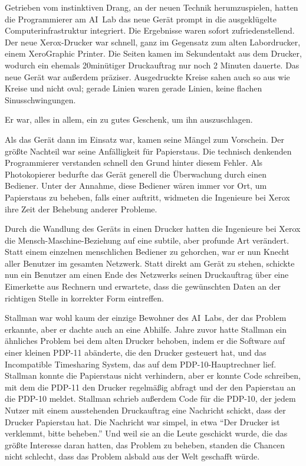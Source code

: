 Getrieben vom instinktiven Drang, an der neuen Technik herumzuspielen, hatten die Programmierer am AI~Lab das neue Gerät prompt in die ausgeklügelte Computerinfrastruktur integriert. Die Ergebnisse waren sofort zufriedenstellend. Der neue Xerox-Drucker war schnell, ganz im Gegensatz zum alten Labordrucker, einem XeroGraphic Printer. Die Seiten kamen im Sekundentakt aus dem Drucker, wodurch ein ehemals 20minütiger Druckauftrag nur noch 2 Minuten dauerte. Das neue Gerät war außerdem präziser. Ausgedruckte Kreise sahen auch so aus wie Kreise und nicht oval; gerade Linien waren gerade Linien, keine flachen Sinusschwingungen.

Er war, alles in allem, ein zu gutes Geschenk, um ihn auszuschlagen.

Als das Gerät dann im Einsatz war, kamen seine Mängel zum Vorschein. Der größte Nachteil war seine Anfälligkeit für Papierstaus. Die technisch denkenden Programmierer verstanden schnell den Grund hinter diesem Fehler. Als Photokopierer bedurfte das Gerät generell die Überwachung durch einen Bediener. Unter der Annahme, diese Bediener wären immer vor Ort, um Papierstaus zu beheben, falls einer auftritt, widmeten die Ingenieure bei Xerox ihre Zeit der Behebung anderer Probleme.

Durch die Wandlung des Geräts in einen  Drucker hatten die Ingenieure bei Xerox die Mensch-Maschine-Beziehung auf eine subtile, aber profunde Art verändert. Statt einem einzelnen menschlichen Bediener zu gehorchen, war er nun Knecht aller Benutzer im gesamten Netzwerk. Statt direkt am Gerät zu stehen, schickte nun ein Benutzer am einen Ende des Netzwerks seinen Druckauftrag über eine Eimerkette aus Rechnern und erwartete, dass die gewünschten Daten an der richtigen Stelle in korrekter Form eintreffen.

Stallman war wohl kaum der einzige Bewohner des AI~Labs, der das Problem erkannte, aber er dachte auch an eine Abhilfe. Jahre zuvor hatte Stallman ein ähnliches Problem bei dem alten Drucker behoben, indem er die Software auf einer kleinen PDP-11 abänderte, die den Drucker gesteuert hat, und das Incompatible Timesharing System, das auf dem PDP-10-Hauptrechner lief. Stallman konnte die Papierstaus nicht verhindern, aber er konnte Code schreiben, mit dem die PDP-11 den Drucker regelmäßig abfragt und der den Papierstau an die PDP-10 meldet. Stallman schrieb außerdem Code für die PDP-10, der jedem Nutzer mit einem ausstehenden Druckauftrag eine Nachricht schickt, dass der Drucker Papierstau hat. Die Nachricht war simpel, in etwa "`Der Drucker ist verklemmt, bitte beheben."' Und weil sie an die Leute geschickt wurde, die das größte Interesse daran hatten, das Problem zu beheben, standen die Chancen nicht schlecht, dass das Problem alsbald aus der Welt geschafft würde.

